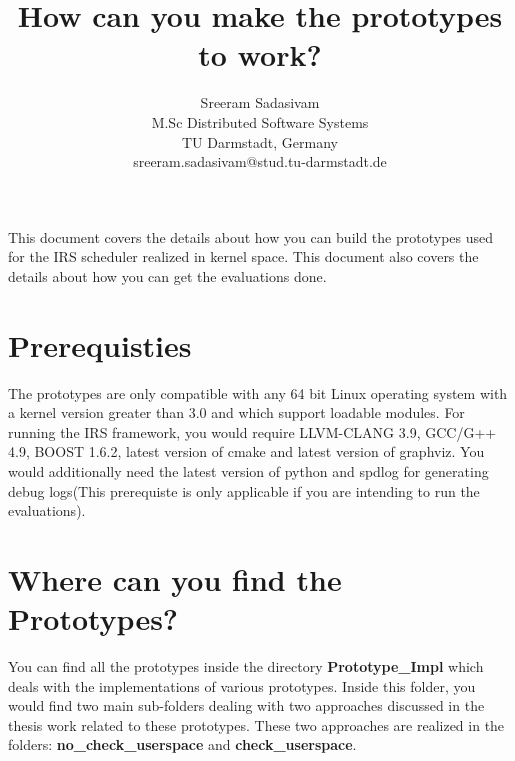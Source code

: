 \documentclass[12pt]{article}
\begin{document}
\title{\vspace{-3.5cm} How can you make the prototypes to work?}
\author{
		 Sreeram Sadasivam\\
		M.Sc Distributed Software Systems\\
		TU Darmstadt, Germany\\
		sreeram.sadasivam@stud.tu-darmstadt.de
}
\maketitle

This document covers the details about how you can build the prototypes used for the IRS scheduler realized in kernel space. 
This document also covers the details about how you can get the evaluations done.

\section*{Prerequisties}
The prototypes are only compatible with any 64 bit Linux operating system with a kernel version greater than 3.0 and which support loadable modules. 
For running the IRS framework, you would require LLVM-CLANG 3.9, GCC/G++ 4.9, BOOST 1.6.2, latest version of cmake and latest version of graphviz. 
You would additionally need the latest version of python and spdlog for generating debug logs(This prerequiste is only applicable if you are intending to run the evaluations). 

\section*{Where can you find the Prototypes?}

You can find all the prototypes inside the directory \textbf{Prototype\_Impl} which deals with the implementations of various prototypes. 
Inside this folder, you would find two main sub-folders dealing with two approaches discussed in the thesis work related to these prototypes. 
These two approaches are realized in the folders: \textbf{no\_check\_userspace} and \textbf{check\_userspace}.
\end{document}
